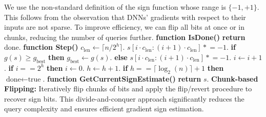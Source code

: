We use the non-standard definition of the sign function whose range is $\{-1, +1\}$. This follows from the observation that DNNs' gradients with respect to their inputs are not sparse.
To improve efficiency, we can flip all bits at once or in chunks, reducing the number of queries further.
\textbf{function IsDone()}
\textbf{return} $\text{done}$.
\textbf{function Step()}
$c_{\text{len}} \leftarrow \lceil n/2^h \rceil$.
$s[i \cdot c_{\text{len}} : (i+1) \cdot c_{\text{len}}] \mathrel{*}= -1$.
\textbf{if} $g(s) \geq g_{\text{best}}$ \textbf{then}
$g_{\text{best}} \leftarrow g(s)$.
\textbf{else}
$s[i \cdot c_{\text{len}} : (i+1) \cdot c_{\text{len}}] \mathrel{*}= -1$.
$i \leftarrow i + 1$.
\textbf{if} $i == 2^h$ \textbf{then}
$i \leftarrow 0$.
$h \leftarrow h + 1$.
\textbf{if} $h == \lceil \log_2(n) \rceil + 1$ \textbf{then}
$\text{done} \leftarrow \text{true}$.
\textbf{function GetCurrentSignEstimate()}
\textbf{return} $s$.
\textbf{Chunk-based Flipping:} Iteratively flip chunks of bits and apply the flip/revert procedure to recover sign bits.
This divide-and-conquer approach significantly reduces the query complexity and ensures efficient gradient sign estimation.